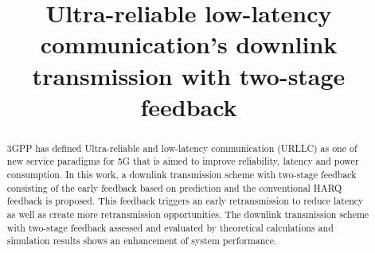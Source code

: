 \documentclass[conference]{IEEEtran}
\begin{document}
\title{Ultra-reliable low-latency communication's downlink transmission with two-stage feedback\\
}

\author{
\and
{}
}

\maketitle

\begin{abstract}
3GPP has defined Ultra-reliable and low-latency communication (URLLC) as one of new service paradigms for 5G that is aimed to improve reliability, latency and power consumption. In this work, a downlink transmission scheme with two-stage feedback consisting of the early feedback based on prediction and the conventional HARQ feedback is proposed. This feedback triggers an early retransmission to reduce latency as well as create more retransmission opportunities. The downlink transmission scheme with two-stage feedback assessed and evaluated by theoretical calculations and simulation results shows an enhancement of system performance.
\end{abstract}
\end{document}
